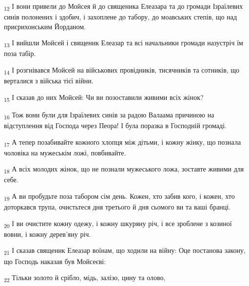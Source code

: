 \begin{tcolorbox}
\textsubscript{12} І вони привели до Мойсея й до священика Елеазара та до громади Ізраїлевих синів полонених і здобич, і захоплене до табору, до моавських степів, що над приєрихонським Йорданом.
\end{tcolorbox}
\begin{tcolorbox}
\textsubscript{13} І вийшли Мойсей і священик Елеазар та всі начальники громади назустріч їм поза табір.
\end{tcolorbox}
\begin{tcolorbox}
\textsubscript{14} І розгнівався Мойсей на військових провідників, тисячників та сотників, що верталися з війська тієї війни.
\end{tcolorbox}
\begin{tcolorbox}
\textsubscript{15} І сказав до них Мойсей: Чи ви позоставили живими всіх жінок?
\end{tcolorbox}
\begin{tcolorbox}
\textsubscript{16} Тож вони були для Ізраїлевих синів за радою Валаама причиною на відступлення від Господа через Пеора! І була поразка в Господній громаді.
\end{tcolorbox}
\begin{tcolorbox}
\textsubscript{17} А тепер позабивайте кожного хлопця між дітьми, і кожну жінку, що познала чоловіка на мужеськім ложі, повбивайте.
\end{tcolorbox}
\begin{tcolorbox}
\textsubscript{18} А всіх молодих жінок, що не познали мужеського ложа, зоставте живими для себе.
\end{tcolorbox}
\begin{tcolorbox}
\textsubscript{19} А ви пробудьте поза табором сім день. Кожен, хто забив кого, і кожен, хто доторкався трупа, очистьтеся дня третього й дня сьомого ви та ваші бранці.
\end{tcolorbox}
\begin{tcolorbox}
\textsubscript{20} І ви очистите кожну одежу, і кожну шкуряну річ, і все зроблене з козиної вовни, і кожну дерев'яну річ.
\end{tcolorbox}
\begin{tcolorbox}
\textsubscript{21} І сказав священик Елеазар воїнам, що ходили на війну: Оце постанова закону, що Господь наказав був Мойсеєві:
\end{tcolorbox}
\begin{tcolorbox}
\textsubscript{22} Тільки золото й срібло, мідь, залізо, цину та олово,
\end{tcolorbox}
